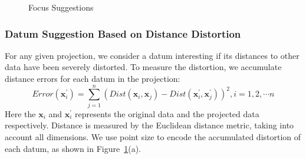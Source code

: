 \begin{figure}[htbp]
\centering
{}
  \caption{Focus Suggestions}
\label{fig:suggestions}
  \end{figure}

\subsubsection{Datum Suggestion Based on Distance Distortion}
For any given projection, we consider a datum interesting if its distances to other data have been severely distorted. To measure the distortion, we accumulate distance errors for each datum in the projection:
\begin{equation}
Error(\mathbf{x}_{i}^{\prime}) = \sum\limits_{j=1}^{n}(Dist(\mathbf{x}_{i}, \mathbf{x}_{j}) - Dist(\mathbf{x}_{i}^{\prime}, \mathbf{x}_{j}^{\prime}))^{2}, i = 1,2,\cdots n
\end{equation}
Here the $\mathbf{x}_{i}$ and $\mathbf{x}_{i}^{\prime}$ represents the original data and the projected data respectively. Distance is measured by the Euclidean distance metric, taking into account all dimensions. We use point size to encode the accumulated distortion of each datum, as shown in Figure~\ref{fig:suggestions}(a).

